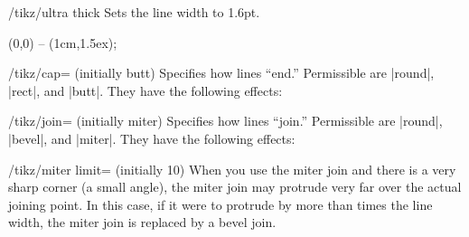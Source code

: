 \begin{stylekey}{/tikz/ultra thick}
  Sets the line width to 1.6pt.
\begin{codeexample}[]
  \tikz {} (0,0) -- (1cm,1.5ex);
\end{codeexample}
\end{stylekey}


\begin{key}{/tikz/cap= (initially butt)}
  Specifies how lines ``end.'' Permissible  are |round|,
  |rect|, and |butt|. They have the following effects:

\begin{codeexample}[]
\end{codeexample}
\end{key}

\begin{key}{/tikz/join= (initially miter)}
  Specifies how lines ``join.'' Permissible  are |round|,
  |bevel|, and |miter|. They have the following effects:

\begin{codeexample}[]
\end{codeexample}

  \begin{key}{/tikz/miter limit= (initially 10)}
    When you use the miter join and there is a very sharp corner (a
    small angle), the miter join may protrude very far over the actual
    joining point. In this case, if it were to protrude by 
    more than  times the line width, the miter join is
    replaced by a bevel join. 

\begin{codeexample}[]
\end{codeexample}
  \end{key}
\end{key}

